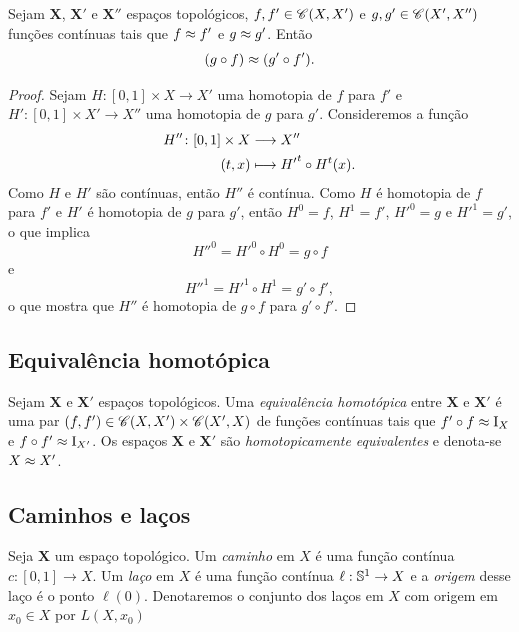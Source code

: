 \begin{proposition}
Sejam $\bm X$, $\bm X'$ e $\bm X''$ espaços topológicos, $f,f' \in \Cont(X,X')$ e $g,g' \in \Cont(X',X'')$ funções contínuas tais que $f \homot f'$ e $g \homot g'$. Então
	\begin{equation*}
	(g \circ f) \homot (g' \circ f').
	\end{equation*}
\end{proposition}
\begin{proof}
Sejam $H\colon [0,1] \times X \to X'$ uma homotopia de $f$ para $f'$ e $H': [0,1] \times X' \to X''$ uma homotopia de $g$ para $g'$. Consideremos a função
	\begin{align*}
	\func{H''}{[0,1] \times X}{X''}{(t,x)}{{H'}^t \circ H^t(x)}.
	\end{align*}
Como $H$ e $H'$ são contínuas, então $H''$ é contínua. Como $H$ é homotopia de $f$ para $f'$ e $H'$ é homotopia de $g$ para $g'$, então $H^0 = f$, $H^1 = f'$, ${H'}^0 = g$ e ${H'}^1 = g'$, o que implica
	\begin{equation*}
	{H''}^0 = {H'}^0 \circ H^0 = g \circ f
	\end{equation*}
e
	\begin{equation*}
	{H''}^1 = {H'}^1 \circ H^1 = g' \circ f',
	\end{equation*}
o que mostra que $H''$ é homotopia de $g \circ f$ para $g' \circ f'$.
\end{proof}

\subsection{Equivalência homotópica}

\begin{definition}
Sejam $\bm X$ e $\bm X'$ espaços topológicos. Uma \emph{equivalência homotópica} entre $\bm X$ e $\bm X'$ é uma par $(f,f') \in \Cont(X,X') \times \Cont(X',X)$ de funções contínuas tais que $f' \circ f \homot \Id_X$ e $f \circ f' \homot \Id_{X'}$. Os espaços $\bm X$ e $\bm X'$ são \emph{homotopicamente equivalentes} e denota-se $X \homot X'$.
\end{definition}

\subsection{Caminhos e laços}

\begin{definition}
Seja $\bm X$ um espaço topológico. Um \textit{caminho} em $X$ é uma função contínua $c\colon [0,1] \to X$. Um \textit{laço} em $X$ é uma função contínua $\ell: \S^1 \to X$ e a \emph{origem} desse laço é o ponto $\ell(0)$. Denotaremos o conjunto dos laços em $X$ com origem em $x_0 \in X$ por $L(X,x_0)$
\end{definition}


